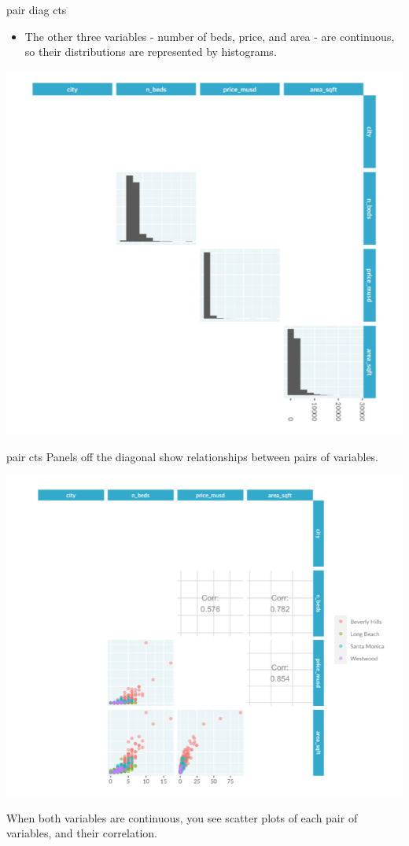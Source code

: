 \documentclass[
  ignorenonframetext,
]{beamer}
\providecommand{\tightlist}{%
  \setlength{\itemsep}{0pt}\setlength{\parskip}{0pt}}
\begin{document}
\begin{frame}{pair diag cts}
\label{pair-diag-cts}
\begin{itemize}
\tightlist
\item
  The other three variables - number of beds, price, and area - are
  continuous, so their distributions are represented by histograms.
\end{itemize}

\includegraphics{../images/im91.png}
\end{frame}

\begin{frame}{pair cts}
\label{pair-cts}
Panels off the diagonal show relationships between pairs of variables.

\includegraphics{../images/im92.png}

When both variables are continuous, you see scatter plots of each pair
of variables, and their correlation.
\end{frame}
\end{document}
